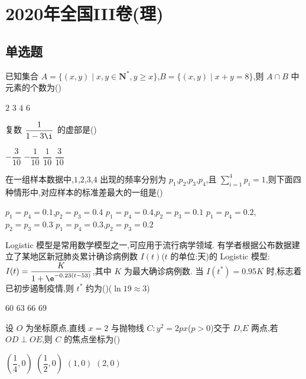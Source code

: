 
\chapter{2020年全国III卷(理)}

\section{单选题}

\begin{problem}
已知集合 \(A=\{(x,y)\mid x,y\in \mathbf N^*,y\ge x\}\),\(B=\{(x,y)\mid x+y=8\}\),则 \(A\cap B\) 中元素的个数为(\quad)

\choices
    {\(2\)}
    {\(3\)}
    {\(4\)}
    {\(6\)}
\end{problem}

\begin{problem}
复数 \(\dfrac{1}{1-3\i}\) 的虚部是(\quad)

\choices
    {\(-\dfrac{3}{10}\)}
    {\(-\dfrac{1}{10}\)}
    {\(\dfrac{1}{10}\)}
    {\(\dfrac{3}{10}\)}
\end{problem}

\begin{problem}
在一组样本数据中,\(1\),\(2\),\(3\),\(4\) 出现的频率分别为 \(p_1\),\(p_2\),\(p_3\),\(p_4\),且 \(\sum_{i=1}^{4} p_i=1\),则下面四种情形中,对应样本的标准差最大的一组是(\quad)

\choices
    {\(p_1=p_4=0.1\),\(p_2=p_3=0.4\)}
    {\(p_1=p_4=0.4\),\(p_2=p_3=0.1\)}
    {\(p_1=p_4=0.2\),\(p_2=p_3=0.3\)}
    {\(p_1=p_4=0.3\),\(p_2=p_3=0.2\)}
\end{problem}

\begin{problem}
Logistic 模型是常用数学模型之一,可应用于流行病学领域. 有学者根据公布数据建立了某地区新冠肺炎累计确诊病例数 \(I(t)\)(\(t\) 的单位:天)的 Logistic 模型:\(I(t)=\dfrac{K}{1+\e^{-0.23(t-53)}}\),其中 \(K\) 为最大确诊病例数. 当 \(I(t^*)=0.95K\) 时,标志着已初步遏制疫情,则 \(t^*\) 约为(\quad)(\(\ln19\approx3\))

\choices
    {\(60\)}
    {\(63\)}
    {\(66\)}
    {\(69\)}
\end{problem}

\begin{problem}
设 \(O\) 为坐标原点,直线 \(x=2\) 与抛物线 \(C:y^2=2px\)(\(p>0\))交于 \(D\),\(E\) 两点,若 \(OD\perp OE\),则 \(C\) 的焦点坐标为(\quad)

\choices
    {\(\left( \dfrac{1}{4},0 \right)\)}
    {\(\left( \dfrac{1}{2},0 \right)\)}
    {\((1,0)\)}
    {\((2,0)\)}
\end{problem}

